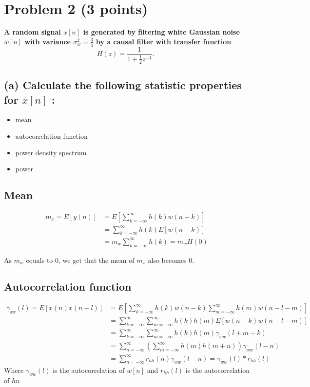 \section{Problem 2 (3 points)}
\textbf{A random signal $x[n]$ is generated by filtering white Gaussian noise $w[n]$ with variance $\sigma_w^2=\frac{3}{4}$ by a causal filter with transfer function}
$$
H(z)=\frac{1}{1+\frac{1}{2} z^{-1}} \text {. }
$$
\subsection*{(a) Calculate the following statistic properties for $x[n]$ :}
\begin{itemize}
    \item mean
    \item autocorrelation function
    \item power density spectrum
    \item power
\end{itemize}

\subsection*{Mean}
$$\begin{aligned} m_x =E[y(n)] & =E\left[\sum_{k=-\infty}^{\infty} h(k) w(n-k)\right] \\ & =\sum_{k=-\infty}^{\infty} h(k) E[w(n-k)] \\ & =m_w \sum_{k=-\infty}^{\infty} h(k)=m_w H(0)\end{aligned}$$

As $m_w$ equals to 0, we get that the mean of $m_x$ also becomes 0.

\subsection*{Autocorrelation function}
$$
\begin{aligned}
\gamma_{x x}(l)  =E[x(n) x(n-l)] & =E\left[\sum_{k=-\infty}^{\infty} h(k) w(n-k) \sum_{m=-\infty}^{\infty} h(m) w(n-l-m)\right] \\
& =\sum_{k=-\infty}^{\infty} \sum_{m=-\infty}^{\infty} h(k) h(m) E[w(n-k) w(n-l-m)] \\
& =\sum_{k=-\infty}^{\infty} \sum_{m=-\infty}^{\infty} h(k) h(m) \gamma_{w w}(l+m-k) \\
& =\sum_{n=-\infty}^{\infty}\left(\sum_{m=-\infty}^{\infty} h(m) h(m+n)\right) \gamma_{w w}(l-n) \\
& =\sum_{n=-\infty}^{\infty} r_{h h}(n) \gamma_{w w}(l-n)=\gamma_{w w}(l) * r_{h h}(l)
\end{aligned}
$$
Where  $\gamma_{w w}(l)$ is the autocorrelation of $w[n]$ and $r_{h h}(l)$ is the autocorrelation of $h{n}$

